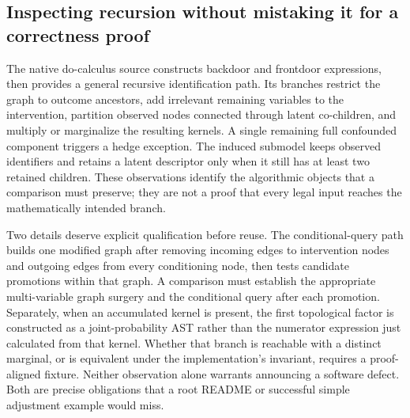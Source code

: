\subsection{Inspecting recursion without mistaking it for a correctness proof}
\label{exec19:cxxid-recursion}
The native do-calculus source constructs backdoor and frontdoor expressions,
then provides a general recursive identification path. Its branches restrict
the graph to outcome ancestors, add irrelevant remaining variables to the
intervention, partition observed nodes connected through latent co-children,
and multiply or marginalize the resulting kernels. A single remaining full
confounded component triggers a hedge exception. The induced submodel keeps
observed identifiers and retains a latent descriptor only when it still has at
least two retained children. These observations identify the algorithmic
objects that a comparison must preserve; they are not a proof that every legal
input reaches the mathematically intended branch.
\citep{exec19_cxx_identification_source}

Two details deserve explicit qualification before reuse. The conditional-query
path builds one modified graph after removing incoming edges to intervention
nodes and outgoing edges from every conditioning node, then tests candidate
promotions within that graph. A comparison must establish the appropriate
multi-variable graph surgery and the conditional query after each promotion.
Separately, when an accumulated kernel is present, the first topological
factor is constructed as a joint-probability AST rather than the numerator
expression just calculated from that kernel. Whether that branch is reachable
with a distinct marginal, or is equivalent under the implementation's invariant,
requires a proof-aligned fixture. Neither observation alone warrants announcing
a software defect. Both are precise obligations that a root README or successful
simple adjustment example would miss.
\citep{exec19_cxx_identification_source}

